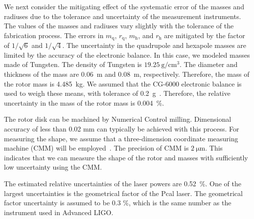 \documentclass[%
 reprint,
superscriptaddress,
 amsmath,amssymb,
 aps,
]{revtex4-1}
\begin{document}
 We next consider the mitigating effect of the systematic error of the masses and radiuses due to the tolerance and uncertainty of the measurement instruments. The values of the masses and radiuses vary slightly with the tolerance of the fabrication process. The errors in $m_{\mathrm{q}}$, $r_{\mathrm{q}}$, $m_{\mathrm{h}}$, and $r_{\mathrm{h}}$ are mitigated by the factor of $1/\sqrt{6}$ and $1/\sqrt{4}$. 
The uncertainty in the quadrupole and hexapole masses are limited by the accuracy of the electronic balance. In this case, we modeled masses made of Tungsten. The density of Tungsten is $19.25~\mathrm{g/cm^3}$. The diameter and thickness of the mass are 0.06~m and 0.08~m, respectively. Therefore, the mass of the rotor mass is 4.485~kg. We assumed that the CG-6000 electronic balance is used to weigh these means, with tolerance of 0.2~g~\cite{CG6000}. Therefore, the relative uncertainty in the mass of the rotor mass is 0.004~\%.

 The rotor disk can be machined by Numerical Control milling. Dimensional accuracy
of less than 0.02 mm can typically be achieved with this process. For measuring the shape, we assume that a three-dimension coordinate measuring machine (CMM) will be employed~\cite{Inoue:16}. The precision of CMM is $2~\mathrm{\mu m}$. This indicates that we can measure the shape of the rotor and masses with  sufficiently low uncertainty using the CMM. 

The estimated relative uncertainties of the laser powers are 0.52~\%. One of the largest uncertainties is the geometrical factor of the Pcal laser. The geometrical factor uncertainty is assumed to be 0.3 \%, which is the same number as the instrument used in Advanced LIGO. 
\end{document}
